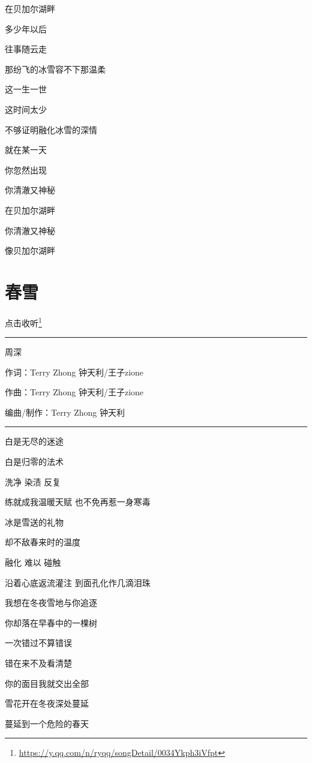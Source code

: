 \documentclass[]{ctexbook}
\renewcommand{\href}[2]{#2\footnote{\url{#1}}}
\begin{document}
在贝加尔湖畔

多少年以后

往事随云走

那纷飞的冰雪容不下那温柔

这一生一世

这时间太少

不够证明融化冰雪的深情

就在某一天

你忽然出现

你清澈又神秘

在贝加尔湖畔

你清澈又神秘

像贝加尔湖畔

\section*{春雪}\label{spring-snow}


\href{https://y.qq.com/n/ryqq/songDetail/0034Ykph3iVfpt}{点击收听}

\begin{center}\rule{0.5\linewidth}{0.5pt}\end{center}

周深

作词：Terry Zhong 钟天利/王子zione

作曲：Terry Zhong 钟天利/王子zione

编曲/制作：Terry Zhong 钟天利

\begin{center}\rule{0.5\linewidth}{0.5pt}\end{center}

白是无尽的迷途

白是归零的法术

洗净 染渍 反复

练就成我温暖天赋 也不免再惹一身寒毒

冰是雪送的礼物

却不敌春来时的温度

融化 难以 碰触

沿着心底返流灌注 到面孔化作几滴泪珠

我想在冬夜雪地与你追逐

你却落在早春中的一棵树

一次错过不算错误

错在来不及看清楚

你的面目我就交出全部

雪花开在冬夜深处蔓延

蔓延到一个危险的春天
\end{document}
